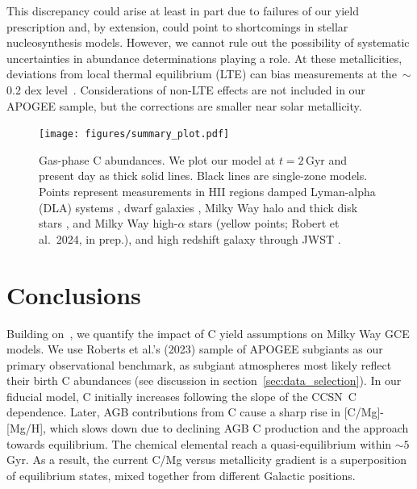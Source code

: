 \documentclass[fleqn,
usenatbib]{mnras}
\newcommand{\citealtjack}{Robert et al.~2024, in prep.}
\newcommand{\cc}{CCSN}
\newcommand{\caah}{[C/Mg]-[Mg/H]}
\newcommand{\about}[1]{${\sim} #1$}
\begin{document}
This discrepancy could arise at least in part due to failures of our yield
prescription and, by extension, could point to shortcomings in stellar
nucleosynthesis models.
However, we cannot rule out the possibility of systematic uncertainties in
abundance determinations playing a role.
At these metallicities, deviations from local thermal equilibrium (LTE) can
bias measurements at the~$\sim$0.2 dex level~\citep[e.g.,][]{amarsi+19}.
Considerations of non-LTE effects are not included in our APOGEE sample, but
the corrections are smaller near solar metallicity.

\begin{figure}
\centering
\texttt{[image: figures/summary\_plot.pdf]}
\caption[]{Gas-phase C abundances. We plot our model at $t=2$\,Gyr and present day as thick solid lines. Black lines are single-zone models. Points represent measurements in 
    HII regions    \citep[pink circles;][]{skillman+20, esteban+02, esteban+09, esteban+14, esteban+19}
    damped Lyman-alpha (DLA) systems \citep[blue triangles;][]{ellison+10, srianand+10, dutta+14, DZ+03, pettini+08, morrison+16,cooke+17},  %
    dwarf galaxies \citep[red diamonds;][]{berg+19},
    Milky Way halo and thick disk stars \citep[green stars;][]{amarsi+19, nissen+14, fabbian+09},
    and Milky Way high-$\alpha$ stars (yellow points; \citealtjack), and high redshift galaxy through JWST \citep[yellow hexagon;][]{arellano-cordova+2022}.
}

\label{fig:gas_phase}
\end{figure}


\section{Conclusions}\label{sec:conclusions}


Building on~\citet{james+23}, we quantify the impact of C yield assumptions on Milky Way GCE models. We use Roberts et al.'s (2023) sample of APOGEE subgiants as our primary observational benchmark, as subgiant atmospheres most likely reflect their birth C abundances (see discussion in section~\ref{sec:data_selection}).
In our fiducial model, C initially increases following the slope of the \cc\ C dependence. Later, AGB contributions from C cause a sharp rise in \caah, which slows down due to declining AGB C production and the approach towards equilibrium. The chemical elemental reach a quasi-equilibrium within \about{5}\,Gyr. As a result, the current C/Mg versus metallicity gradient is a superposition of equilibrium states, mixed together from different Galactic positions.
\end{document}
